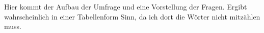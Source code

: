 \documentclass[../main.tex]{subfiles}
\begin{document}
Hier kommt der Aufbau der Umfrage und eine Vorstellung der Fragen. Ergibt wahrscheinlich in einer Tabellenform Sinn, da ich dort die Wörter nicht mitzählen muss.
\end{document}
